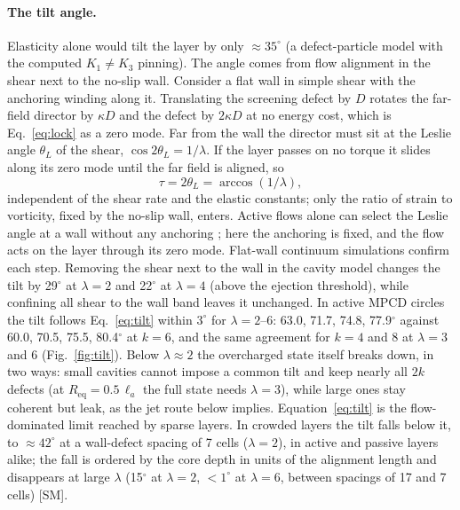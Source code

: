 \documentclass[aps,prl,twocolumn,superscriptaddress,amsmath,amssymb,reprint]{revtex4-2}
\newcommand{\la}{\ell_a}
\begin{document}
\paragraph*{The tilt angle.} Elasticity alone would tilt the layer by only $\approx35^\circ$ (a defect-particle model with the computed $K_1\neq K_3$ pinning). The angle comes from flow alignment in the shear next to the no-slip
wall. Consider a flat wall in simple shear with the anchoring winding along it. Translating the screening defect by $D$ rotates the far-field director by $\kappa D$
and the defect by $2\kappa D$ at no energy cost, which is Eq.~\eqref{eq:lock} as a zero mode. Far from the wall the director must sit at the Leslie angle
$\theta_L$ of the shear, $\cos2\theta_L=1/\lambda$. If the layer passes on no torque it slides along its zero mode until the far field is aligned, so
\begin{equation}
\tau=2\theta_L=\arccos(1/\lambda),\label{eq:tilt}
\end{equation}
independent of the shear rate and the elastic constants; only the ratio of strain to vorticity, fixed by the no-slip wall, enters. Active flows alone can select the
Leslie angle at a wall without any anchoring \cite{Fang2026}; here the anchoring is fixed, and the flow acts on the layer through its zero mode. Flat-wall continuum simulations
confirm each step. Removing the shear next to the wall in the cavity model changes the tilt by 29$^\circ$ at $\lambda=2$ and 22$^\circ$ at $\lambda=4$ (above the ejection threshold), while confining all shear to the wall band leaves it
unchanged. In active MPCD circles the tilt follows Eq.~\eqref{eq:tilt} within $3^\circ$ for $\lambda=2$--6: 63.0, 71.7, 74.8, 77.9$^\circ$ against 60.0, 70.5, 75.5,
80.4$^\circ$ at $k=6$, and the same agreement for $k=4$ and 8 at $\lambda=3$ and 6 (Fig.~\ref{fig:tilt}). Below $\lambda\approx2$ the overcharged state itself breaks down, in two ways: small cavities cannot impose a common tilt and keep nearly all $2k$ defects
(at $R_\mathrm{eq}=0.5\,\la$ the full state needs $\lambda=3$), while large ones stay coherent but leak, as the jet route below implies.
Equation~\eqref{eq:tilt} is the flow-dominated limit reached by sparse layers. In crowded layers the tilt falls below it, to $\approx42^\circ$ at a wall-defect spacing of 7 cells
($\lambda=2$), in active and passive layers alike; the fall is ordered by the core depth in units of the alignment length and disappears at large $\lambda$
(15$^\circ$ at $\lambda=2$, $<1^\circ$ at $\lambda=6$, between spacings of 17 and 7 cells) [SM].
\end{document}
